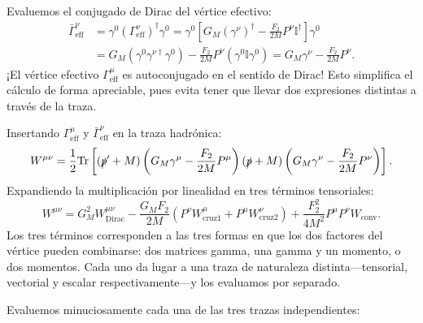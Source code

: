 \documentclass[10pt,a4paper]{article}
\begin{document}
Evaluemos el conjugado de Dirac del vértice efectivo:
\begin{align}
\bar{\Gamma}^\nu_{\text{eff}} &= \gamma^0 (\Gamma^\nu_{\text{eff}})^\dagger \gamma^0 = \gamma^0 \left[ G_M (\gamma^\nu)^\dagger - \frac{F_2}{2M} P^\nu \mathbb{I}^\dagger \right] \gamma^0 \nonumber \\
&= G_M (\gamma^0 \gamma^{\nu\dagger} \gamma^0) - \frac{F_2}{2M} P^\nu (\gamma^0 \mathbb{I} \gamma^0) = G_M \gamma^\nu - \frac{F_2}{2M} P^\nu.
\end{align}
¡El vértice efectivo $\Gamma^\mu_{\text{eff}}$ es autoconjugado en el sentido de Dirac! Esto simplifica el cálculo de forma apreciable, pues evita tener que llevar dos expresiones distintas a través de la traza.

Insertando $\Gamma^\mu_{\text{eff}}$ y $\bar{\Gamma}^\nu_{\text{eff}}$ en la traza hadrónica:
\begin{equation}
W^{\mu\nu} = \frac{1}{2} \text{Tr} \left[ (\slashed{p}' + M) \left( G_M \gamma^\mu - \frac{F_2}{2M} P^\mu \right) (\slashed{p} + M) \left( G_M \gamma^\nu - \frac{F_2}{2M} P^\nu \right) \right].
\end{equation}
Expandiendo la multiplicación por linealidad en tres términos tensoriales:
\begin{equation}
W^{\mu\nu} = G_M^2 W_{\text{Dirac}}^{\mu\nu} - \frac{G_M F_2}{2M} \left( P^\nu W_{\text{cruz1}}^\mu + P^\mu W_{\text{cruz2}}^\nu \right) + \frac{F_2^2}{4M^2} P^\mu P^\nu W_{\text{conv}}.
\label{eq:W_three_parts}
\end{equation}
Los tres términos corresponden a las tres formas en que los dos factores del vértice pueden combinarse: dos matrices gamma, una gamma y un momento, o dos momentos. Cada uno da lugar a una traza de naturaleza distinta---tensorial, vectorial y escalar respectivamente---y los evaluamos por separado.

Evaluemos minuciosamente cada una de las tres trazas independientes:
\end{document}

